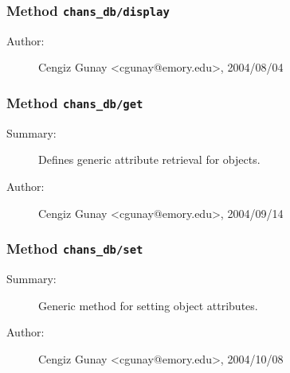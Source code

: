 \subsubsection[Method \texttt{display}]{Method \texttt{chans\_db/display}}%
%
\label{ref_chans_db__display}%
\hypertarget{ref_chans_db__display}{}%
\begin{description}
%
%
%
%
%
%
%
\item[Author:]%
Cengiz Gunay <cgunay@emory.edu>, 2004/08/04%
\end{description}
\methodline%
\subsubsection[Method \texttt{get}]{Method \texttt{chans\_db/get}}%
%
\label{ref_chans_db__get}%
\hypertarget{ref_chans_db__get}{}%
\begin{description}
\item[Summary:]Defines generic attribute retrieval for objects.
%
%
%
%
%
%
%
\item[Author:]%
Cengiz Gunay <cgunay@emory.edu>, 2004/09/14%
\end{description}
\methodline%
\subsubsection[Method \texttt{set}]{Method \texttt{chans\_db/set}}%
%
\label{ref_chans_db__set}%
\hypertarget{ref_chans_db__set}{}%
\begin{description}
\item[Summary:]Generic method for setting object attributes.
%
%
%
%
%
%
%
\item[Author:]%
Cengiz Gunay <cgunay@emory.edu>, 2004/10/08%
\end{description}
\methodline%
